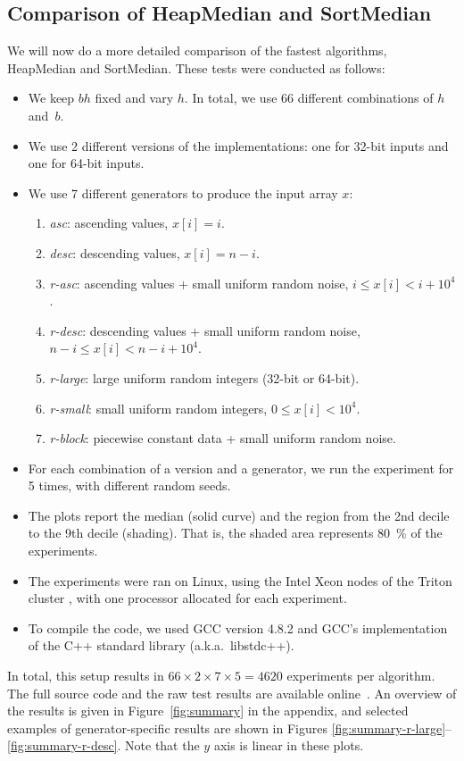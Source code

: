 \documentclass[a4paper,11pt]{article}
\begin{document}
\subsection{Comparison of HeapMedian and SortMedian}

We will now do a more detailed comparison of the fastest algorithms, HeapMedian and SortMedian. These tests were conducted as follows:
\begin{itemize}
    \item We keep $bh$ fixed and vary $h$. In total, we use 66 different combinations of $h$ and~$b$.
    \item We use 2 different versions of the implementations: one for 32-bit inputs and one for 64-bit inputs.
    \item We use 7 different generators to produce the input array $x$:
    \begin{enumerate}[noitemsep]
        \item \emph{asc}: ascending values, $x[i] = i$.
        \item \emph{desc}: descending values, $x[i] = n - i$.
        \item \emph{r-asc}: ascending values + small uniform random noise, $i \le x[i] < i+10^4$.
        \item \emph{r-desc}: descending values + small uniform random noise, $n-i \le x[i] < n-i+10^4$.
        \item \emph{r-large}: large uniform random integers (32-bit or 64-bit).
        \item \emph{r-small}: small uniform random integers, $0 \le x[i] < 10^4$.
        \item \emph{r-block}: piecewise constant data + small uniform random noise.
    \end{enumerate}
    \item For each combination of a version and a generator, we run the experiment for 5 times, with different random seeds.
    \item The plots report the median (solid curve) and the region from the 2nd decile to the 9th decile (shading). That is, the shaded area represents 80~\% of the experiments.
    \item The experiments were ran on Linux, using the Intel Xeon nodes of the Triton cluster , with one processor allocated for each experiment.
    \item To compile the code, we used GCC version 4.8.2 and GCC's implementation of the C++ standard library (a.k.a.\ libstdc++).
\end{itemize}
In total, this setup results in $66 \times 2 \times 7 \times 5 = 4620$ experiments per algorithm. The full source code and the raw test results are available online~. An overview of the results is given in Figure~\ref{fig:summary} in the appendix, and selected examples of generator-specific results are shown in Figures \ref{fig:summary-r-large}--\ref{fig:summary-r-desc}. Note that the $y$ axis is linear in these plots.
\end{document}
